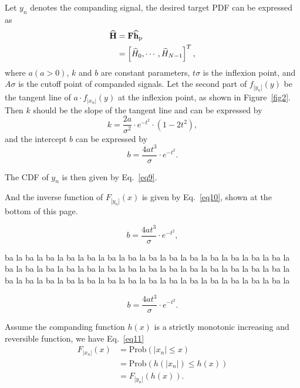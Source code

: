 \documentclass{ccjnl}
\begin{document}
Let $y_n$ denotes the companding signal, the desired target PDF can be expressed as
\begin{equation}
\begin{aligned}
\widehat{\mathbf{H}}&={\mathbf{F}} {\widehat{\mathbf{h}}_{\rm p}} \\
&=\left[\widehat{H}_{0}, \cdots, \widehat{H}_{N-1}\right]^{T} ,
\end{aligned}
\label{eq6}
\end{equation}
where $a (a > 0)$, $k$ and $b$ are constant parameters, $t\sigma$ is the inflexion point, and $A\sigma$ is the cutoff point of companded signals. Let the second part of ${f_{\left| {{y_n}} \right|}}(y)$ be the tangent line of $a \cdot {f_{\left| {{x_n}} \right|}}(y)$ at the inflexion point, as shown in Figure~\ref{fig2}. Then $k$ should be the slope of the tangent line and can be expressed by
\begin{equation}
k = \frac{{2a}}{{{\sigma ^2}}} \cdot {e^{ - {t^2}}} \cdot \left( {1 - 2{t^2}} \right),
\label{eq7}
\end{equation}
and the intercept $b$ can be expressed by 
\begin{equation}
b = \frac{{4a{t^3}}}{\sigma } \cdot {e^{ - {t^2}}}.
\label{eq8}
\end{equation}

The CDF of $y_n$ is then given by Eq.~\eqref{eq9}.

And the inverse function of ${F_{\left| {{y_n}} \right|}}(x)$ is given by Eq.~\eqref{eq10}, shown at the bottom of this page.
\begin{strip}
\begin{equation}
b = \frac{{4a{t^3}}}{\sigma } \cdot {e^{ - {t^2}}},
\label{eq9}
\end{equation}
\end{strip}%
ba la ba la ba la ba la ba la ba la ba la ba la ba la ba la ba la ba la ba la ba la ba la ba la ba la ba la ba la ba la ba la ba la ba la ba la ba la ba la ba la ba la ba la ba la ba la ba la ba la ba la ba la ba la ba la ba la ba la ba la ba la ba la 
\begin{strip}
\begin{equation}
b = \frac{{4a{t^3}}}{\sigma } \cdot {e^{ - {t^2}}}.
\label{eq10}
\end{equation}
\end{strip}%

Assume the companding function $h(x)$ is a strictly monotonic increasing and reversible function, we have Eq.~\eqref{eq11}
\begin{equation}
\begin{aligned}
{F_{\left| {{x_n}} \right|}}\left( x \right) &= {\text{Prob}}\left( {\left| {{x_n}} \right| \leqslant x} \right)\\
&= {\text{Prob}}\left( {h\left( {\left| {{x_n}} \right|} \right) \leqslant h\left( x \right)} \right)\\
& = {F_{\left| {{y_n}} \right|}}\left( {h\left( x \right)} \right).
\end{aligned}
\label{eq11}
\end{equation}
\end{document}
